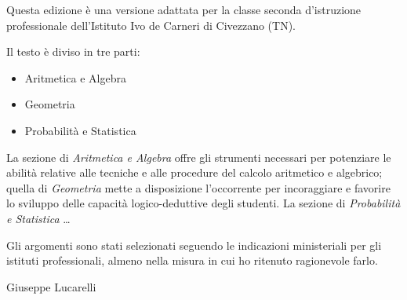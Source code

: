Questa edizione è una versione adattata per la classe seconda d'istruzione professionale dell'Istituto Ivo de Carneri di Civezzano (TN).

Il testo è diviso in tre parti:
\begin{itemize}
  \item Aritmetica e Algebra
  \item Geometria
  \item Probabilità e Statistica
\end{itemize}
La sezione di \emph{Aritmetica e Algebra} offre gli strumenti necessari per potenziare le abilità relative alle tecniche e alle procedure del calcolo aritmetico e algebrico; quella di \emph{Geometria} mette a disposizione l'occorrente per incoraggiare e favorire lo sviluppo delle capacità logico-deduttive degli studenti. La sezione di \emph{Probabilità e Statistica} \dots

Gli argomenti sono stati selezionati seguendo le indicazioni ministeriali per gli istituti professionali, almeno nella misura in cui ho ritenuto ragionevole farlo.

\begin{flushright}
Giuseppe Lucarelli
\end{flushright}

